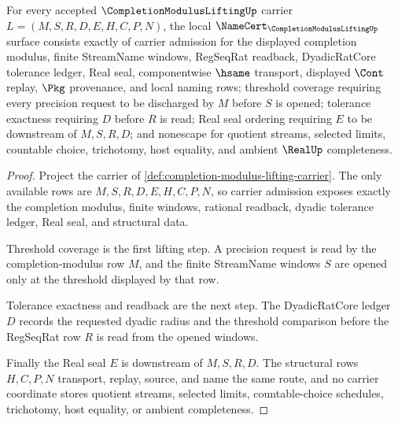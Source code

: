 \begin{theorem}
\label{thm:completion-modulus-lifting-namecert-obligations}
For every accepted $\CompletionModulusLiftingUp$ carrier $L=(M,S,R,D,E,H,C,P,N)$, the local $\NameCert_{\CompletionModulusLiftingUp}$ surface consists exactly of carrier admission for the displayed completion modulus, finite StreamName windows, RegSeqRat readback, DyadicRatCore tolerance ledger, Real seal, componentwise $\hsame$ transport, displayed $\Cont$ replay, $\Pkg$ provenance, and local naming rows; threshold coverage requiring every precision request to be discharged by $M$ before $S$ is opened; tolerance exactness requiring $D$ before $R$ is read; Real seal ordering requiring $E$ to be downstream of $M,S,R,D$; and nonescape for quotient streams, selected limits, countable choice, trichotomy, host equality, and ambient $\RealUp$ completeness.
\end{theorem}
\begin{proof}
Project the carrier of \autoref{def:completion-modulus-lifting-carrier}. The only available rows are $M,S,R,D,E,H,C,P,N$, so carrier admission exposes exactly the completion modulus, finite windows, rational readback, dyadic tolerance ledger, Real seal, and structural data.

Threshold coverage is the first lifting step. A precision request is read by the completion-modulus row $M$, and the finite StreamName windows $S$ are opened only at the threshold displayed by that row.

Tolerance exactness and readback are the next step. The DyadicRatCore ledger $D$ records the requested dyadic radius and the threshold comparison before the RegSeqRat row $R$ is read from the opened windows.

Finally the Real seal $E$ is downstream of $M,S,R,D$. The structural rows $H,C,P,N$ transport, replay, source, and name the same route, and no carrier coordinate stores quotient streams, selected limits, countable-choice schedules, trichotomy, host equality, or ambient completeness.
\end{proof}

